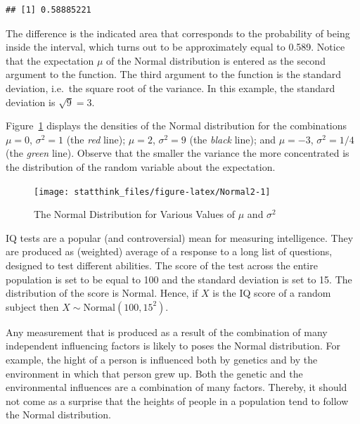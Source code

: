 \documentclass[]{krantz}
\theoremstyle{definition}
\theoremstyle{definition}
\theoremstyle{definition}
\theoremstyle{remark}
\let\BeginKnitrBlock\begin \let\EndKnitrBlock\end
\begin{document}
\begin{verbatim}
## [1] 0.58885221
\end{verbatim}

The difference is the indicated area that corresponds to the probability
of being inside the interval, which turns out to be approximately equal
to 0.589. Notice that the expectation \(\mu\) of the Normal distribution
is entered as the second argument to the function. The third argument to
the function is the standard deviation, i.e.~the square root of the
variance. In this example, the standard deviation is \(\sqrt{9}=3\).

Figure~\ref{fig:Normal2} displays the densities of the Normal
distribution for the combinations \(\mu= 0\), \(\sigma^2 = 1\) (the
\emph{red} line); \(\mu = 2\), \(\sigma^2 = 9\) (the \emph{black} line);
and \(\mu = -3\), \(\sigma^2 = 1/4\) (the \emph{green} line). Observe
that the smaller the variance the more concentrated is the distribution
of the random variable about the expectation.

\begin{figure}

{\centering \texttt{[image: statthink\_files/figure-latex/Normal2-1]} 

}

\caption{The Normal Distribution for Various Values of $\mu$ and $\sigma^2$}\label{fig:Normal2}
\end{figure}

\BeginKnitrBlock{example}
\protect\hypertarget{exm:exnormal1}{}{\label{exm:exnormal1} }IQ tests are a
popular (and controversial) mean for measuring intelligence. They are
produced as (weighted) average of a response to a long list of
questions, designed to test different abilities. The score of the test
across the entire population is set to be equal to 100 and the standard
deviation is set to 15. The distribution of the score is Normal. Hence,
if \(X\) is the IQ score of a random subject then
\(X \sim \mathrm{Normal}(100,15^2)\).
\EndKnitrBlock{example}

\BeginKnitrBlock{example}
\protect\hypertarget{exm:exnormal2}{}{\label{exm:exnormal2} }Any measurement
that is produced as a result of the combination of many independent
influencing factors is likely to poses the Normal distribution. For
example, the hight of a person is influenced both by genetics and by the
environment in which that person grew up. Both the genetic and the
environmental influences are a combination of many factors. Thereby, it
should not come as a surprise that the heights of people in a population
tend to follow the Normal distribution.
\EndKnitrBlock{example}
\end{document}
